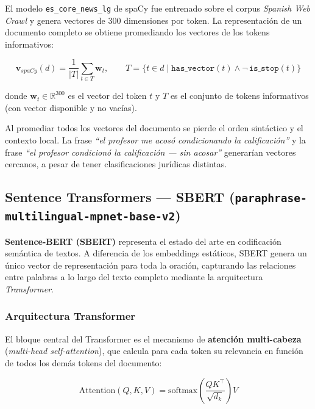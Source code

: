 El modelo \texttt{es\_core\_news\_lg} de spaCy \cite{honnibal2020} fue entrenado sobre el corpus
\textit{Spanish Web Crawl} y genera vectores de 300 dimensiones por token. La
representación de un documento completo se obtiene promediando los vectores de
los tokens informativos:

\begin{equation}
  \mathbf{v}_{spaCy}(d)
  = \frac{1}{|T|} \sum_{t \in T} \mathbf{w}_t, \qquad
  T = \bigl\{t \in d \;\big|\; \texttt{has\_vector}(t)
      \wedge \neg\,\texttt{is\_stop}(t)\bigr\}
  \label{eq:spacy}
\end{equation}

donde $\mathbf{w}_t \in \mathbb{R}^{300}$ es el vector del token $t$ y $T$ es
el conjunto de tokens informativos (con vector disponible y no vacías).

Al promediar todos los vectores del documento se pierde el orden sintáctico y el
contexto local. La frase \textit{``el profesor me acosó condicionando la
calificación''} y la frase \textit{``el profesor condicionó la calificación —
sin acosar''} generarían vectores cercanos, a pesar de tener clasificaciones
jurídicas distintas.

\subsection{Sentence Transformers — SBERT
            (\texttt{paraphrase-multilingual-mpnet-base-v2})}

\textbf{Sentence-BERT (SBERT)} representa el estado del arte en codificación
semántica de textos.\cite{reimers2019} A diferencia de los embeddings estáticos, SBERT genera
un único vector de representación para toda la oración, capturando las relaciones
entre palabras a lo largo del texto completo mediante la arquitectura
\textit{Transformer}.

\subsubsection*{Arquitectura Transformer}

El bloque central del Transformer es el mecanismo de \textbf{atención
multi-cabeza} (\textit{multi-head self-attention}), que calcula para cada token
su relevancia en función de todos los demás tokens del documento:

\begin{equation}
  \text{Attention}(Q, K, V)
  = \text{softmax}\!\left(\frac{QK^\top}{\sqrt{d_k}}\right) V
  \label{eq:attention}
\end{equation}

